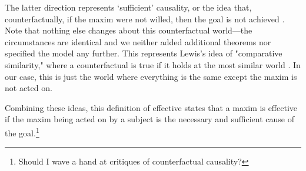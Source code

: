 \begin{isabellebody}
\begin{isamarkuptext}
The latter direction represents `sufficient' causality, or the idea that, counterfactually,
if the maxim were not willed, then the goal is not achieved \cite{lewiscausality}. Note that nothing else changes about this
counterfactual world—the circumstances are identical and we neither added additional theorems nor 
specified the model any further. This represents Lewis's idea of "comparative similarity,"  where 
a counterfactual is true if it holds at the most similar world \cite{lewiscounterfactuals}. In our case, this is just the world 
where everything is the same except the maxim is not acted on.

Combining these ideas, this definition of effective states that a maxim is effective if the 
maxim being acted on by a subject is the necessary and sufficient cause of the goal.\footnote{Should I wave a hand at critiques of counterfactual causality?}


\end{isamarkuptext}
\end{isabellebody}
